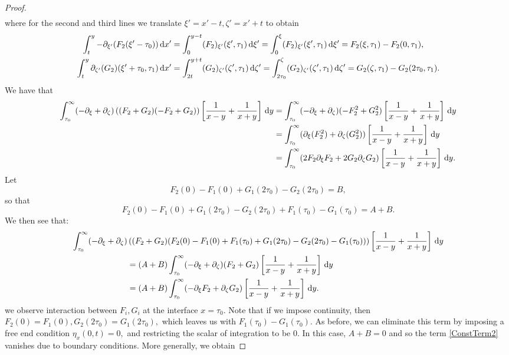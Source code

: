 \documentclass[10pt,reqno,oneside,a4paper, landscape]{article}
\begin{document}
\begin{proof}
\begin{align*}
\end{align*}
where for the second and third lines we translate $\xi' = x'-t, \zeta' = x'+t$ to obtain
\begin{align*}
 \int^{y}_{t} -\partial_{\xi'}(F_2(\xi' - \tau_0 )) \,\mathrm{d} x' &=  \int^{y-t}_{0}(F_2)_{\xi'}(\xi', \tau_1) \,\mathrm{d} \xi' =\int^{\xi}_{0}(F_2)_{\xi'}(\xi', \tau_1) \,\mathrm{d} \xi' = F_2(\xi, \tau_1) - F_2(0, \tau_1), \\
\int^{y}_{t} \partial_{\zeta'}(G_2)(\xi'+\tau_0, \tau_1) \,\mathrm{d} x' &=  \int^{y+t}_{2t}(G_2)_{\zeta'}(\zeta', \tau_1) \,\mathrm{d} \zeta' = \int^{\zeta}_{2\tau_0}(G_2)_{\zeta'}(\zeta', \tau_1) \,\mathrm{d} \zeta' = G_2(\zeta, \tau_1) - G_2(2\tau_0, \tau_1).
\end{align*}
We have that 
\begin{align*}
\int_{\tau_0}^\infty  (- \partial_\xi + \partial_\zeta)\left( (F_2 + G_2) (- F_2 + G_2) \right) \left[ \frac{1}{x-y} + \frac{1}{x+y} \right] \,\mathrm{d} y &= \int_{\tau_0}^\infty  (- \partial_\xi + \partial_\zeta)(-F_2^2 + G_2^2)\left[ \frac{1}{x-y} + \frac{1}{x+y} \right] \,\mathrm{d} y \\
&= \int_{\tau_0}^\infty (\partial_\xi (F_2^2) + \partial_\zeta(G_2^2) )\left[ \frac{1}{x-y} + \frac{1}{x+y} \right] \,\mathrm{d} y \\
&= \int_{\tau_0}^\infty (2 F_2 \partial_\xi F_2 + 2 G_2 \partial_\zeta G_2 )\left[ \frac{1}{x-y} + \frac{1}{x+y} \right] \,\mathrm{d} y.
\end{align*}
Let 
\[ F_2(0) - F_1(0)  +  G_1(2\tau_0) - G_2(2\tau_0) = B, \]
so that
\[ F_2(0) - F_1(0)  +  G_1(2\tau_0) - G_2(2\tau_0) + F_1(\tau_0) - G_1(\tau_0) = A + B. \]
We then see that:
\begin{align}
 \int_{\tau_0}^\infty (- \partial_\xi + \partial_\zeta)&\left( (F_2 + G_2) (F_2(0) - F_1(0)  + F_1(\tau_0)  + G_1(2\tau_0) - G_2(2\tau_0) - G_1(\tau_0) ) \right) \left[ \frac{1}{x-y} + \frac{1}{x+y} \right] \,\mathrm{d} y \nonumber \\
 &= (A+B)\int_{\tau_0}^\infty (- \partial_\xi + \partial_\zeta) (F_2 + G_2)  \left[ \frac{1}{x-y} + \frac{1}{x+y} \right] \,\mathrm{d} y \nonumber \\
 &= (A+B)\int_{\tau_0}^\infty (- \partial_\xi F_2+ \partial_\zeta G_2) \left[ \frac{1}{x-y} + \frac{1}{x+y} \right] \,\mathrm{d} y. \label{ConstTerm2}
\end{align}
we observe interaction between $F_i, G_i$ at the interface $x= \tau_0.$ Note that if we impose continuity, then $F_2(0) = F_1(0), G_2(2\tau_0) = G_1(2\tau_0),$ which leaves us with $F_1(\tau_0)- G_1(\tau_0).$ As before, we can eliminate this term by imposing a free end condition $\eta_x(0,t) = 0,$ and restricting the scalar of integration to be $0.$ In this case, $A+B = 0$ and so the term \eqref{ConstTerm2} vanishes due to boundary conditions. More generally, we obtain

\end{proof}
\end{document}
